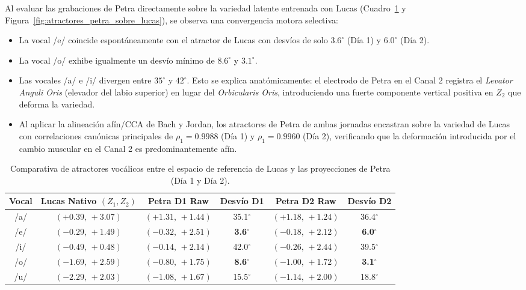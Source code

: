 \documentclass[11pt,a4paper]{article}
\begin{document}
Al evaluar las grabaciones de Petra directamente sobre la variedad latente entrenada con Lucas (Cuadro~\ref{tab:atractores_lucas_petra} y Figura~\ref{fig:atractores_petra_sobre_lucas}), se observa una convergencia motora selectiva:
\begin{itemize}
    \item La vocal /e/ coincide espontáneamente con el atractor de Lucas con desvíos de solo $3.6^\circ$ (Día 1) y $6.0^\circ$ (Día 2).
    \item La vocal /o/ exhibe igualmente un desvío mínimo de $8.6^\circ$ y $3.1^\circ$.
    \item Las vocales /a/ e /i/ divergen entre $35^\circ$ y $42^\circ$. Esto se explica anatómicamente: el electrodo de Petra en el Canal 2 registra el \textit{Levator Anguli Oris} (elevador del labio superior) en lugar del \textit{Orbicularis Oris}, introduciendo una fuerte componente vertical positiva en $Z_2$ que deforma la variedad.
    \item Al aplicar la alineación afín/CCA de Bach y Jordan, los atractores de Petra de ambas jornadas encastran sobre la variedad de Lucas con correlaciones canónicas principales de $\rho_1 = 0.9988$ (Día 1) y $\rho_1 = 0.9960$ (Día 2), verificando que la deformación introducida por el cambio muscular en el Canal 2 es predominantemente afín.
\end{itemize}

\begin{table}[H]
\centering
\small
\begin{tabular}{cccccc}
\toprule
\textbf{Vocal} & \textbf{Lucas Nativo $(Z_1, Z_2)$} & \textbf{Petra D1 Raw} & \textbf{Desvío D1} & \textbf{Petra D2 Raw} & \textbf{Desvío D2} \\
\midrule
/a/ & $(+0.39,\,+3.07)$ & $(+1.31,\,+1.44)$ & 35.1$^\circ$ & $(+1.18,\,+1.24)$ & 36.4$^\circ$ \\
/e/ & $(-0.29,\,+1.49)$ & $(-0.32,\,+2.51)$ & \textbf{3.6}$^\circ$ & $(-0.18,\,+2.12)$ & \textbf{6.0}$^\circ$ \\
/i/ & $(-0.49,\,+0.48)$ & $(-0.14,\,+2.14)$ & 42.0$^\circ$ & $(-0.26,\,+2.44)$ & 39.5$^\circ$ \\
/o/ & $(-1.69,\,+2.59)$ & $(-0.80,\,+1.75)$ & \textbf{8.6}$^\circ$ & $(-1.00,\,+1.72)$ & \textbf{3.1}$^\circ$ \\
/u/ & $(-2.29,\,+2.03)$ & $(-1.08,\,+1.67)$ & 15.5$^\circ$ & $(-1.14,\,+2.00)$ & 18.8$^\circ$ \\
\bottomrule
\end{tabular}
\caption{Comparativa de atractores vocálicos entre el espacio de referencia de Lucas y las proyecciones de Petra (Día 1 y Día 2).}
\label{tab:atractores_lucas_petra}
\end{table}
\end{document}
